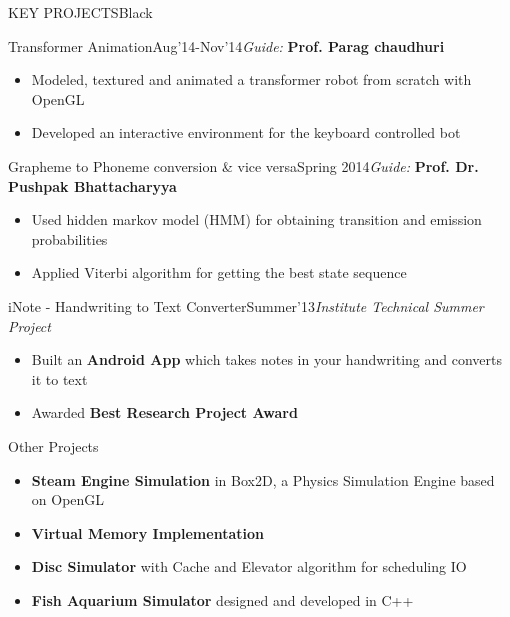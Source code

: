 \documentclass[11pt,a4paper]{article} %
\begin{document}
\begin{ressection}{KEY PROJECTS}{Black}
\pagebreak

\begin{ressubsection}{Transformer Animation}{Aug'14-Nov'14}{\textit{Guide:} \textbf{Prof. Parag chaudhuri}}
\begin{itemize}
\itemsep-0.3em
\item Modeled, textured and animated a transformer robot from scratch with OpenGL
\item Developed an interactive environment for the keyboard controlled bot
\end{itemize}
\end{ressubsection}


\begin{ressubsection}{Grapheme to Phoneme conversion \& vice versa}{Spring 2014}{\textit{Guide:} \textbf{Prof. Dr. Pushpak Bhattacharyya}}
\begin{itemize}
\itemsep-0.3em
\item Used hidden markov model (HMM) for obtaining transition and emission probabilities
\item Applied Viterbi algorithm for getting the best state sequence
\end{itemize}
\end{ressubsection}
  

\begin{ressubsection}{iNote - Handwriting to Text Converter}{Summer'13}{\textit{Institute Technical Summer Project}}
\begin{itemize}
\itemsep-0.3em
\item Built an \textbf{Android App} which takes notes in your handwriting and converts it to text
\item Awarded \textbf{Best Research Project Award}
\end{itemize}
\end{ressubsection}

\begin{ressubsection}{Other Projects}{}{}
\begin{itemize}
\itemsep-0.3em
\item \textbf{Steam Engine Simulation} in Box2D, a Physics Simulation Engine based on OpenGL
\item \textbf{Virtual Memory Implementation}
\item \textbf{Disc Simulator} with Cache and Elevator algorithm for scheduling IO
\item \textbf{Fish Aquarium Simulator} designed and developed in C++
\end{itemize}
\end{ressubsection}



\end{ressection}
\end{document}
